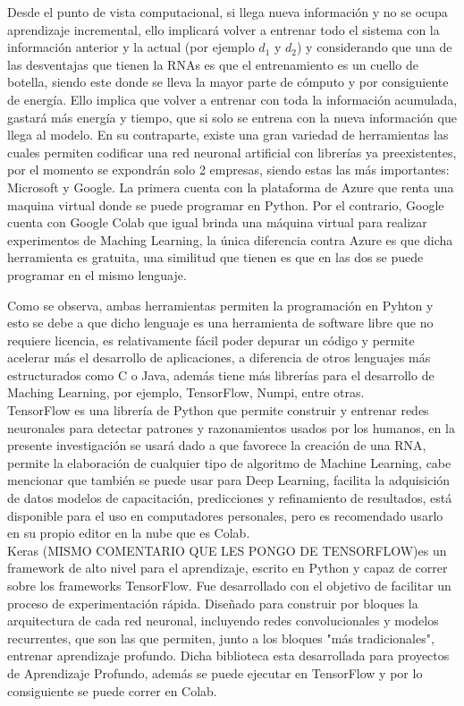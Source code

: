    Desde el punto de vista computacional, si llega nueva información y no se ocupa aprendizaje 
    incremental, ello implicar\'a volver a entrenar todo el sistema con la información anterior y 
    la actual (por ejemplo $d_{1}$ y $d_{2}$) y considerando que una de las desventajas que tienen la 
    RNAs es que el entrenamiento es un cuello de botella, siendo este donde se lleva la mayor 
    parte de cómputo y por consiguiente de energía. Ello implica que volver a entrenar con toda 
    la información acumulada, gastará más energía y tiempo, que si solo se entrena con la nueva 
    información que llega al modelo. En su contraparte,  existe una gran variedad de herramientas 
    las cuales permiten codificar una red neuronal artificial con librerías ya preexistentes, por 
    el momento se expondrán solo 2 empresas, siendo estas las más importantes: Microsoft y Google. 
    La primera cuenta con la plataforma de Azure que renta una maquina virtual donde se puede 
    programar en Python.  Por el contrario, Google cuenta con Google Colab que igual brinda 
    una m\'aquina virtual para realizar experimentos de Maching Learning, la \'unica diferencia 
    contra Azure es que dicha herramienta es gratuita, una similitud que tienen es que en las 
    dos se puede programar en el mismo lenguaje.

    Como se observa, ambas herramientas permiten la programación en Pyhton y esto se debe a que 
    dicho lenguaje es una herramienta de software libre que no requiere licencia, es relativamente 
    fácil poder depurar un código y permite acelerar más el desarrollo de aplicaciones,  a diferencia 
    de otros lenguajes más estructurados como C o Java, adem\'as tiene m\'as librerías para el 
    desarrollo de Maching Learning, por ejemplo, TensorFlow, Numpi, entre otras. \\

    TensorFlow es una librería de Python que permite construir y entrenar redes neuronales para 
    detectar patrones y razonamientos usados por los humanos, en la presente investigaci\'on se 
    usar\'a dado a que favorece la creaci\'on de una RNA, permite la elaboraci\'on de cualquier 
    tipo de algoritmo de Machine Learning, cabe mencionar que también se puede usar para Deep Learning, 
    facilita la adquisici\'on de datos modelos de capacitaci\'on, predicciones y refinamiento de 
    resultados, est\'a disponible para el uso en computadores personales, pero es recomendado 
    usarlo en su propio editor en la nube que es Colab. \\ 

    Keras (MISMO COMENTARIO QUE LES PONGO DE TENSORFLOW)es un framework de alto nivel para 
    el aprendizaje, escrito en Python y capaz de correr sobre los frameworks TensorFlow. Fue 
    desarrollado con el objetivo de facilitar un proceso de experimentación rápida. Diseñado 
    para construir por bloques la arquitectura de cada red neuronal, incluyendo redes 
    convolucionales y modelos recurrentes, que son las que permiten, junto a los bloques 
    "más tradicionales", entrenar aprendizaje profundo. Dicha biblioteca esta desarrollada para 
    proyectos de Aprendizaje Profundo, adem\'as se puede ejecutar en TensorFlow y por lo consiguiente 
    se puede correr en Colab.